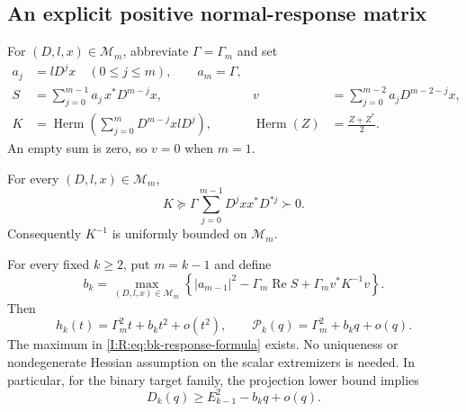\subsection{An explicit positive normal-response matrix}

For $(D,l,x)\in\mathcal M_m$, abbreviate $\Gamma=\Gamma_m$ and set
\begin{align}
 a_j&=lD^jx\quad(0\le j\le m),\qquad a_m=\Gamma,
 \label{I:R:eq:response-a}\\
 S&=\sum_{j=0}^{m-1}a_j\,x^*D^{m-j}x,
 &v&=\sum_{j=0}^{m-2}a_jD^{m-2-j}x,
 \label{I:R:eq:response-S-v}\\
 K&=\operatorname{Herm}\left(\sum_{j=0}^{m}D^{m-j}xlD^j\right),
 &\operatorname{Herm}(Z)&=\frac{Z+Z^*}{2}.
 \label{I:R:eq:response-K}
\end{align}
An empty sum is zero, so $v=0$ when $m=1$.

\begin{lemma}
\label{I:R:lem:response-K-positive}
For every $(D,l,x)\in\mathcal M_m$,
\begin{equation}
 \boxed{\displaystyle
 K\succeq\Gamma\sum_{j=0}^{m-1}D^jxx^*D^{*j}\succ0.}
 \label{I:R:eq:response-K-coercivity}
\end{equation}
Consequently $K^{-1}$ is uniformly bounded on $\mathcal M_m$.
\end{lemma}


\begin{theorem}
\label{I:R:thm:all-budget-response}
For every fixed $k\ge2$, put $m=k-1$ and define
\begin{equation}
 b_k=\max_{(D,l,x)\in\mathcal M_m}
 \left\{|a_{m-1}|^2-\Gamma_m\operatorname{Re}S
                  +\Gamma_m v^*K^{-1}v\right\}.
 \label{I:R:eq:bk-response-formula}
\end{equation}
Then
\begin{equation}
 \boxed{\displaystyle
 h_k(t)=\Gamma_m^2t+b_kt^2+o(t^2),\qquad
 \mathcal P_k(q)=\Gamma_m^2+b_kq+o(q).}
 \label{I:R:eq:all-budget-envelope-expansion}
\end{equation}
The maximum in \eqref{I:R:eq:bk-response-formula} exists.  No uniqueness or
nondegenerate Hessian assumption on the scalar extremizers is needed.
In particular, for the binary target family, the projection lower bound
implies
\begin{equation}
 D_k(q)\ge E_{k-1}^2-b_kq+o(q).
 \label{I:R:eq:all-budget-D-lower}
\end{equation}
\end{theorem}

